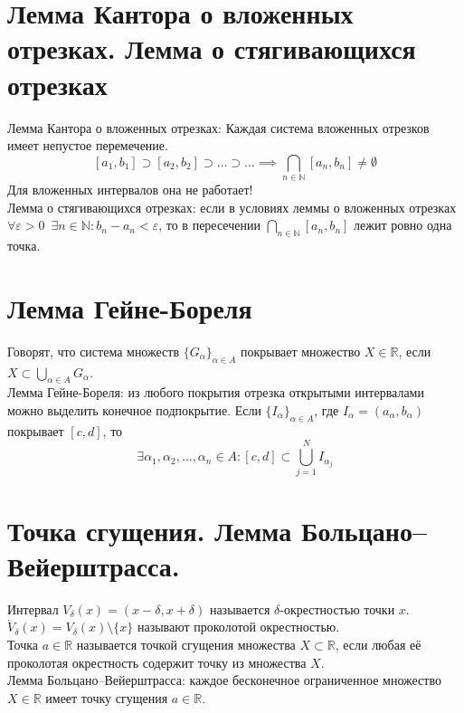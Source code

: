 \documentclass[11pt, a4paper]{article}
\def\R{\mathbb{R}}
\def\N{\mathbb{N}}
\def\sp{\, \, \,}
\def\ds{\displaystyle}
\begin{document}
    \section{Лемма Кантора о вложенных отрезках. Лемма о стягивающихся отрезках}
    Лемма Кантора о вложенных отрезках: Каждая система вложенных отрезков имеет непустое перемечение.
    $$ [a_1, b_1] \supset [a_2, b_2] \supset \ldots \supset \ldots \implies \bigcap_{n \in \N} [a_n, b_n] \neq \emptyset$$
    Для вложенных интервалов она не работает!\\
    Лемма о стягивающихся отрезках: если в условиях леммы о вложенных отрезках\\$\forall \varepsilon > 0 \sp \exists n \in \N : b_n - a_n < \varepsilon$, то в пересечении $\ds \bigcap_{n \in \N} [a_n,b_n]$ лежит ровно одна точка.

    \section{Лемма Гейне-Бореля}
    Говорят, что система множеств $\{G_{\alpha}\}_{\alpha \in A}$ покрывает множество $X \in \R$, если $\ds X \subset \bigcup_{\alpha \in A} G_{\alpha}$.\\
    Лемма Гейне-Бореля: из любого покрытия отрезка открытыми интервалами можно выделить конечное подпокрытие. Если $\{I_{\alpha}\}_{\alpha \in A}$, где $I_\alpha = (a_{\alpha}, b_{\alpha})$ покрывает $[c, d]$, то
    $$\exists \alpha_1, \alpha_2, \ldots, \alpha_n \in A: [c,d] \subset \bigcup_{j=1}^N I_{\alpha_j}$$

    \section{Точка сгущения. Лемма Больцано--Вейерштрасса.}
    Интервал $V_{\delta} (x) = (x-\delta , x+\delta )$ называется $\delta$-окрестностью точки $x$.\\
    $\dot{V}_{\delta} (x) = V_{\delta} (x) \setminus \{x\}$ называют проколотой окрестностью.\\
    Точка $a \in \R$ называется точкой сгущения множества $X \subset \R$, если любая её проколотая окрестность содержит точку из множества $X$.\\
    Лемма Больцано--Вейерштрасса: каждое бесконечное ограниченное множество $X \in \R$ имеет точку сгущения $a \in \R$.
\end{document}

